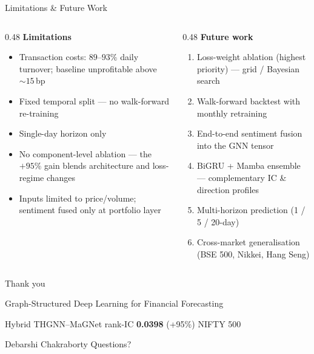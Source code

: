 \documentclass[aspectratio=169, 10pt]{beamer}
\newcommand{\best}[1]{\textcolor{primary}{\textbf{#1}}}
\begin{document}
\begin{frame}{Limitations \& Future Work}
  \begin{columns}[T]
    \begin{column}{0.48\textwidth}
      \textbf{Limitations}
      \begin{itemize}\setlength{\itemsep}{3pt}
        \item \alert{Transaction costs}: $89$--$93\%$ daily turnover; baseline
              unprofitable above ${\sim}15$\,bp
        \item Fixed temporal split — no walk-forward re-training
        \item Single-day horizon only
        \item \alert{No component-level ablation} — the $+95\%$ gain blends
              architecture and loss-regime changes
        \item Inputs limited to price/volume; sentiment fused only at portfolio layer
      \end{itemize}
    \end{column}
    \begin{column}{0.48\textwidth}
      \textbf{Future work}
      \begin{enumerate}\setlength{\itemsep}{3pt}
        \item \alert{Loss-weight ablation} (highest priority) — grid / Bayesian search
        \item Walk-forward backtest with monthly retraining
        \item End-to-end sentiment fusion into the GNN tensor
        \item \alert{BiGRU + Mamba ensemble} — complementary IC \& direction profiles
        \item Multi-horizon prediction (1 / 5 / 20-day)
        \item Cross-market generalisation (BSE 500, Nikkei, Hang Seng)
      \end{enumerate}
    \end{column}
  \end{columns}
\end{frame}

\begin{frame}[standout]
  Thank you
  \vspace{0.4cm}

  {\large Graph-Structured Deep Learning for Financial Forecasting}

  \vspace{0.2cm}
  {\normalsize Hybrid THGNN--MaGNet \;\textbar\; rank-IC \best{0.0398} (+95\%) \;\textbar\; NIFTY 500}

  \vspace{0.6cm}
  {\small Debarshi Chakraborty \quad Questions?}
\end{frame}
\end{document}
